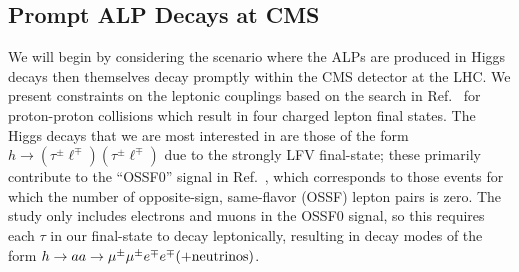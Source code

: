 \subsection{Prompt ALP Decays at CMS}\label{sec:higgs_decay_CMS}
We will begin by considering the scenario where the ALPs are produced in Higgs decays then themselves decay promptly within the CMS detector at the LHC. We present constraints on the leptonic couplings based on the search in Ref.~\cite{CMS:2019lwf} for proton-proton collisions which result in four charged lepton final states. The Higgs decays that we are most interested in are those of the form $h \rightarrow (\tau^\pm  \ell^\mp)(\tau^\pm \ell^\mp)$ due to the strongly LFV final-state; these primarily contribute to the ``OSSF0'' signal in Ref.~\cite{CMS:2019lwf}, which corresponds to those events for which the number of opposite-sign, same-flavor (OSSF) lepton pairs is zero. The study only includes electrons and muons in the OSSF0 signal, so this requires each $\tau$ in our final-state to decay leptonically, resulting in decay modes of the form $h\rightarrow aa \rightarrow \mu^\pm \mu^\pm e^\mp e^\mp (+ {\rm neutrinos})$.

